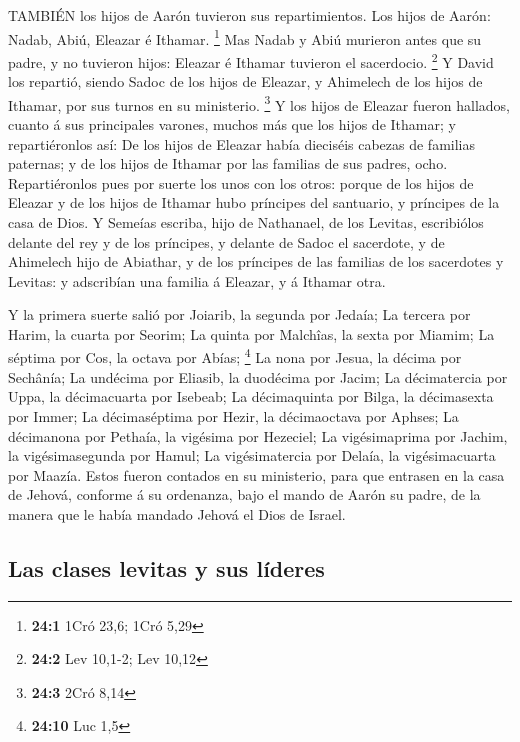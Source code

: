  TAMBIÉN los hijos de Aarón tuvieron sus repartimientos. Los
hijos de Aarón: Nadab, Abiú, Eleazar é Ithamar. \footnote{\textbf{24:1}
  1Cró 23,6; 1Cró 5,29}  Mas Nadab y Abiú murieron antes que
su padre, y no tuvieron hijos: Eleazar é Ithamar tuvieron el sacerdocio.
\footnote{\textbf{24:2} Lev 10,1-2; Lev 10,12}  Y David los
repartió, siendo Sadoc de los hijos de Eleazar, y Ahimelech de los hijos
de Ithamar, por sus turnos en su ministerio. \footnote{\textbf{24:3}
  2Cró 8,14}  Y los hijos de Eleazar fueron hallados, cuanto
á sus principales varones, muchos más que los hijos de Ithamar; y
repartiéronlos así: De los hijos de Eleazar había dieciséis cabezas de
familias paternas; y de los hijos de Ithamar por las familias de sus
padres, ocho.  Repartiéronlos pues por suerte los unos con
los otros: porque de los hijos de Eleazar y de los hijos de Ithamar hubo
príncipes del santuario, y príncipes de la casa de Dios.  Y
Semeías escriba, hijo de Nathanael, de los Levitas, escribiólos delante
del rey y de los príncipes, y delante de Sadoc el sacerdote, y de
Ahimelech hijo de Abiathar, y de los príncipes de las familias de los
sacerdotes y Levitas: y adscribían una familia á Eleazar, y á Ithamar
otra.

 Y la primera suerte salió por Joiarib, la segunda por
Jedaía;  La tercera por Harim, la cuarta por Seorim;
 La quinta por Malchîas, la sexta por Miamim; 
La séptima por Cos, la octava por Abías; \footnote{\textbf{24:10} Luc
  1,5}  La nona por Jesua, la décima por Sechânía;
 La undécima por Eliasib, la duodécima por Jacim;
 La décimatercia por Uppa, la décimacuarta por Isebeab;
 La décimaquinta por Bilga, la décimasexta por Immer;
 La décimaséptima por Hezir, la décimaoctava por Aphses;
 La décimanona por Pethaía, la vigésima por Hezeciel;
 La vigésimaprima por Jachim, la vigésimasegunda por Hamul;
 La vigésimatercia por Delaía, la vigésimacuarta por
Maazía.  Estos fueron contados en su ministerio, para que
entrasen en la casa de Jehová, conforme á su ordenanza, bajo el mando de
Aarón su padre, de la manera que le había mandado Jehová el Dios de
Israel.

\hypertarget{las-clases-levitas-y-sus-luxedderes}{%
\subsection{Las clases levitas y sus
líderes}\label{las-clases-levitas-y-sus-luxedderes}}

